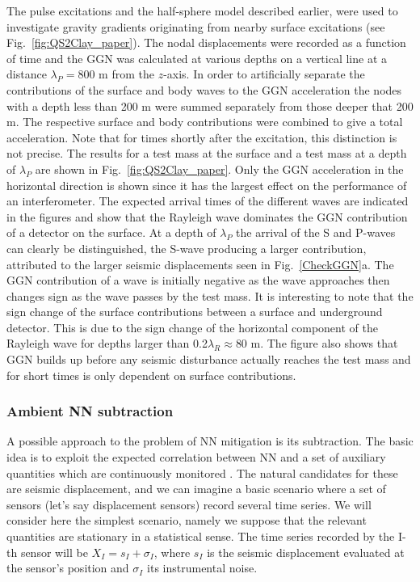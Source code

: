 The pulse excitations and the half-sphere model described earlier, were used to investigate gravity gradients originating from nearby surface excitations (see Fig.~\ref{fig:QS2Clay_paper}). The nodal displacements were recorded as a function of time and the GGN was calculated at various depths on a vertical line at a distance $\lambda_P= 800$ m from the $z$-axis. In order to artificially separate the contributions of the surface and body waves to the GGN acceleration the nodes with a depth less than 200 m were summed separately from those deeper that 200 m. The respective surface and body contributions were combined to give a total acceleration. Note that for times shortly after the excitation, this distinction is not precise. The results for a test mass at the surface and a test mass at a depth of $\lambda_P$ are shown in Fig.~\ref{fig:QS2Clay_paper}. Only the GGN acceleration in the horizontal direction is shown since it has the largest effect on the performance of an interferometer. The expected arrival times of the different waves are indicated in the figures and show that the Rayleigh wave dominates the GGN contribution of a detector on the surface. At a depth of $\lambda_P$ the arrival of the S and P-waves can clearly be distinguished, the S-wave producing a larger contribution, attributed to the larger seismic displacements seen in Fig.~\ref{CheckGGN}a. The GGN contribution of a wave is initially negative as the wave approaches then changes sign as the wave passes by the test mass. It is interesting to note that the sign change of the surface contributions between a surface and underground detector. This is due to the sign change of the horizontal component of the Rayleigh wave for depths larger than 0.2$\lambda_R \approx 80$ m. The figure also shows that GGN builds up before any seismic disturbance actually reaches the test mass and for short times is only dependent on surface contributions.

\FloatBarrier
\subsubsection{Ambient NN subtraction}
\label{subsub:AmbientNNsubtraction}
A possible approach to the problem of NN mitigation is its subtraction. The
basic idea is to exploit the expected correlation between NN and a set of
auxiliary quantities which are continuously monitored \cite{CatichaPRE}. The
natural candidates for these are seismic displacement, and we can imagine a
basic scenario where a set of sensors (let's say displacement sensors) record
several time series. We will consider here the simplest scenario, namely we
suppose that the relevant quantities are stationary in a statistical
sense. The time series recorded by the I-th sensor will be $X_I = s_I
+ \sigma_I$, where $s_I$ is the seismic displacement evaluated at the sensor's
position and $\sigma_I$ its instrumental noise.

